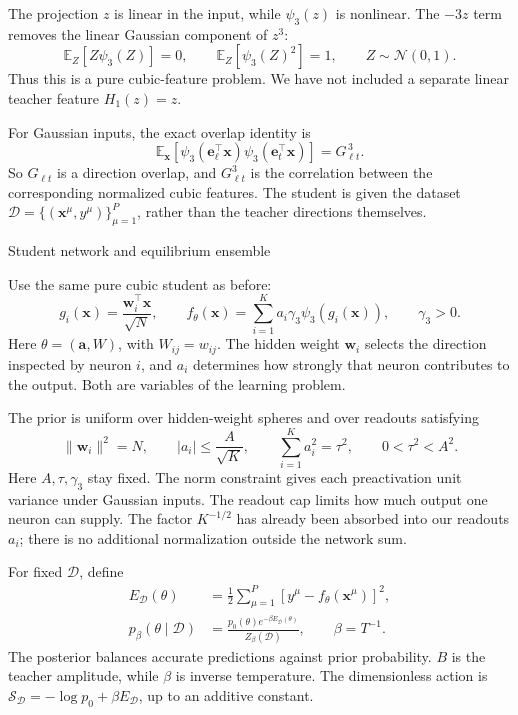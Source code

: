 \documentclass[11pt, reqno]{amsart}
\makeatletter
\def\section{\@startsection{section}{1}%
  \z@{.7\linespacing\@plus\linespacing}{.5\linespacing}%
  {\normalfont\scshape\centering}}
\theoremstyle{notestyle}
\theoremstyle{defstyle}
\makeatother
\begin{document}
The projection $z$ is linear in the input, while $\psi_3(z)$ is
nonlinear. The $-3z$ term removes the linear Gaussian component of
$z^3$:
\begin{equation}
 \mathbb E_Z[Z\psi_3(Z)]=0,\qquad
 \mathbb E_Z[\psi_3(Z)^2]=1,\qquad Z\sim\mathcal N(0,1).
\end{equation}
Thus this is a pure cubic-feature problem. We have not included a
separate linear teacher feature $H_1(z)=z$.

For Gaussian inputs, the exact overlap identity is
\begin{equation}
 \mathbb E_{\mathbf x}\!\left[
 \psi_3(\mathbf e_\ell^\top\mathbf x)
 \psi_3(\mathbf e_t^\top\mathbf x)\right]=G_{\ell t}^{\,3}.
\end{equation}
So $G_{\ell t}$ is a direction overlap, and $G_{\ell t}^3$ is the
correlation between the corresponding normalized cubic features.
The student is given the dataset
$\mathcal D=\{(\mathbf x^\mu,y^\mu)\}_{\mu=1}^P$, rather than the
teacher directions themselves.

\section{Student network and equilibrium ensemble}

Use the same pure cubic student as before:
\begin{equation}
 g_i(\mathbf x)=\frac{\mathbf w_i^\top\mathbf x}{\sqrt N},
 \qquad
 f_\theta(\mathbf x)=\sum_{i=1}^K
 a_i\gamma_3\psi_3(g_i(\mathbf x)),\qquad \gamma_3>0.
\end{equation}
Here $\theta=(\mathbf a,W)$, with $W_{ij}=w_{ij}$. The hidden weight
$\mathbf w_i$ selects the direction inspected by neuron $i$, and
$a_i$ determines how strongly that neuron contributes to the output.
Both are variables of the learning problem.

The prior is uniform over hidden-weight spheres and over readouts
satisfying
\begin{equation}
 \|\mathbf w_i\|^2=N,\qquad
 |a_i|\leq\frac{A}{\sqrt K},\qquad
 \sum_{i=1}^K a_i^2=\tau^2,\qquad 0<\tau^2<A^2.
\end{equation}
Here $A,\tau,\gamma_3$ stay fixed. The norm constraint gives each
preactivation unit variance under Gaussian inputs. The readout cap
limits how much output one neuron can supply. The factor $K^{-1/2}$
has already been absorbed into our readouts $a_i$; there is no
additional normalization outside the network sum.

For fixed $\mathcal D$, define
\begin{align}
 E_{\mathcal D}(\theta)
 &=\frac12\sum_{\mu=1}^P
 [y^\mu-f_\theta(\mathbf x^\mu)]^2,\\
 p_\beta(\theta\mid\mathcal D)
 &=\frac{p_0(\theta)e^{-\beta E_{\mathcal D}(\theta)}}
 {Z_\beta(\mathcal D)},\qquad \beta=T^{-1}.
\end{align}
The posterior balances accurate predictions against prior probability.
$B$ is the teacher amplitude, while $\beta$ is inverse temperature.
The dimensionless action is
$\mathcal S_{\mathcal D}=-\log p_0+\beta E_{\mathcal D}$, up to an
additive constant.
\end{document}
